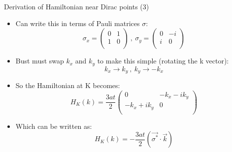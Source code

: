 \documentclass{beamer}
\begin{document}
\begin{frame}[t]{Derivation of Hamiltonian near Dirac points (3)}
\begin{itemize}
\item Can write this in terms of Pauli matrices $\sigma$:
\begin{equation}
\sigma_x = \left ( \begin{array}{cc} 0 & 1\\ 1 & 0\\ \end{array} \right ) ~,~ \sigma_y = \left ( \begin{array}{cc} 0 & -i\\ i & 0\\ \end{array} \right )
\end{equation}
\item Bust must swap $k_x$ and $k_y$ to make this simple (rotating the k vector):
\begin{equation}
k_x \rightarrow k_y ~,~ k_y \rightarrow -k_x
\end{equation}
\item So the Hamiltonian at K becomes:
  \begin{equation}
  H_K (k) = \frac{3at}{2}\left ( \begin{array}{cc}
  0 & -k_x - i k_y\\ 
  -k_x + ik_y & 0\\ \end{array} \right )
  \end{equation}
  \item Which can be written as:
  \begin{equation}
  H_K(k) = -\frac{3at}{2}\left ( \vec{\sigma^*} \cdot \vec{k} \right )
  \end{equation}
\end{itemize}
\end{frame}
\end{document}
